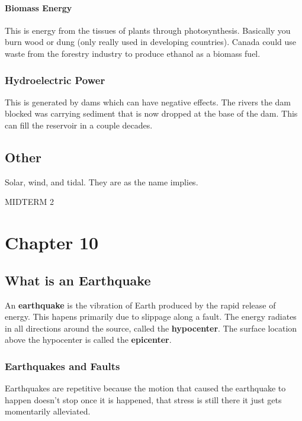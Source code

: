 \documentclass{article}
\begin{document}
\paragraph{Biomass Energy} %
\label{par:biomass_energy}
This is energy from the tissues of plants through photosynthesis. Basically you burn wood or dung (only really used in developing countries). Canada could use waste from the forestry industry to produce ethanol as a biomass fuel.

\subsubsection{Hydroelectric Power} %
\label{sub:hydroelectric_power}
This is generated by dams which can have negative effects. The rivers the dam blocked was carrying sediment that is now dropped at the base of the dam. This can fill the reservoir in a couple decades.

\subsection{Other} %
\label{sub:other}
Solar, wind, and tidal. They are as the name implies.


\newpage
MIDTERM 2
\newpage


\section{Chapter 10} %
\label{sec:chapter_10}
\subsection{What is an Earthquake} %
\label{sub:what_is_an_earthquake}
An \textbf{earthquake} is the vibration of Earth produced by the rapid release of energy. This hapens primarily due to slippage along a fault. The energy radiates in all directions around the source, called the \textbf{hypocenter}. The surface location above the hypocenter is called the \textbf{epicenter}.

\subsubsection{Earthquakes and Faults} %
\label{ssub:earthquakes_and_faults}
Earthquakes are repetitive because the motion that caused the earthquake to happen doesn't stop once it is happened, that stress is still there it just gets momentarily alleviated.
\end{document}
